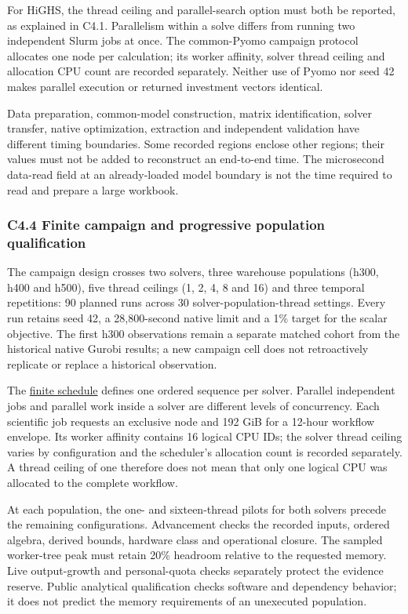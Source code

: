 \documentclass[
  english,
  11pt,
  a4paper,
]{article}
\begin{document}
For HiGHS, the thread ceiling and parallel-search option must both be
reported, as explained in C4.1. Parallelism within a solve differs from
running two independent Slurm jobs at once. The common-Pyomo campaign
protocol allocates one node per calculation; its worker affinity, solver
thread ceiling and allocation CPU count are recorded separately. Neither
use of Pyomo nor seed 42 makes parallel execution or returned investment
vectors identical.

Data preparation, common-model construction, matrix identification,
solver transfer, native optimization, extraction and independent
validation have different timing boundaries. Some recorded regions
enclose other regions; their values must not be added to reconstruct an
end-to-end time. The microsecond data-read field at an already-loaded
model boundary is not the time required to read and prepare a large
workbook.

\subsubsection{C4.4 Finite campaign and progressive population
qualification}\label{c4.3-finite-campaign-and-progressive-population-qualification}

The campaign design crosses two solvers, three warehouse populations
(h300, h400 and h500), five thread ceilings (1, 2, 4, 8 and 16) and
three temporal repetitions: 90 planned runs across 30
solver-population-thread settings. Every run retains seed 42, a
28,800-second native limit and a 1\% target for the scalar objective.
The first h300 observations remain a separate matched cohort from the
historical native Gurobi results; a new campaign cell does not
retroactively replicate or replace a historical observation.

The
\href{https://github.com/unb-lamfo-or-ai-hpc/model-agrologistic/blob/82c2c19ce619f1251043829b10a4702ac88a7cdd/experiments/pyomo_scaling_serial_schedule_v1.json}{finite
schedule} defines one ordered sequence per solver. Parallel independent
jobs and parallel work inside a solver are different levels of
concurrency. Each scientific job requests an exclusive node and 192 GiB
for a 12-hour workflow envelope. Its worker affinity contains 16 logical
CPU IDs; the solver thread ceiling varies by configuration and the
scheduler's allocation count is recorded separately. A thread ceiling of
one therefore does not mean that only one logical CPU was allocated to
the complete workflow.

At each population, the one- and sixteen-thread pilots for both solvers
precede the remaining configurations. Advancement checks the recorded
inputs, ordered algebra, derived bounds, hardware class and operational
closure. The sampled worker-tree peak must retain 20\% headroom relative
to the requested memory. Live output-growth and personal-quota checks
separately protect the evidence reserve. Public analytical qualification
checks software and dependency behavior; it does not predict the memory
requirements of an unexecuted population.
\end{document}
